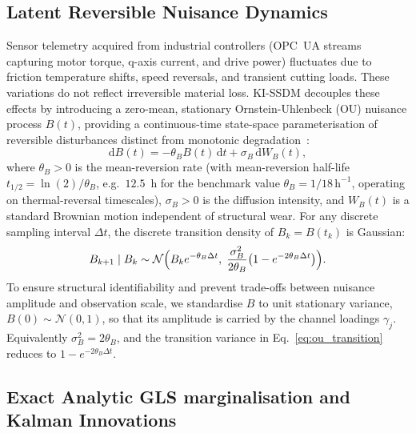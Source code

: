 \documentclass[a4paper,fleqn]{cas-dc}
\begin{document}
\subsection{Latent Reversible Nuisance Dynamics}
\label{subsec:nuisance_b}

Sensor telemetry acquired from industrial controllers (OPC~UA streams capturing motor torque, q-axis current, and drive power) fluctuates due to friction temperature shifts, speed reversals, and transient cutting loads. These variations do not reflect irreversible material loss. KI-SSDM decouples these effects by introducing a zero-mean, stationary Ornstein-Uhlenbeck (OU) nuisance process $B(t)$, providing a continuous-time state-space parameterisation of reversible disturbances distinct from monotonic degradation~\cite{Zhang_2023_RESS}:
\begin{equation}
    \mathrm{d}B(t) = -\theta_B B(t)\,\mathrm{d}t + \sigma_B\,\mathrm{d}W_B(t),
    \label{eq:ou_process}
\end{equation}
where $\theta_B > 0$ is the mean-reversion rate (with mean-reversion half-life $t_{1/2} = \ln(2) / \theta_B$, e.g.\ $12.5$~h for the benchmark value $\theta_B = 1/18\,\mathrm{h}^{-1}$, operating on thermal-reversal timescales), $\sigma_B > 0$ is the diffusion intensity, and $W_B(t)$ is a standard Brownian motion independent of structural wear. For any discrete sampling interval $\Delta t$, the discrete transition density of $B_k = B(t_k)$ is Gaussian:
\begin{equation}
    B_{k+1} \mid B_k \sim \mathcal{N}\Bigl(B_k e^{-\theta_B \Delta t}, \; \frac{\sigma_B^2}{2\theta_B}\bigl(1 - e^{-2\theta_B \Delta t}\bigr)\Bigr).
    \label{eq:ou_transition}
\end{equation}
To ensure structural identifiability and prevent trade-offs between nuisance amplitude and observation scale, we standardise $B$ to unit stationary variance, $B(0) \sim \mathcal{N}(0, 1)$, so that its amplitude is carried by the channel loadings $\gamma_j$. Equivalently $\sigma_B^2 = 2\theta_B$, and the transition variance in Eq.~\eqref{eq:ou_transition} reduces to $1 - e^{-2\theta_B \Delta t}$.

\subsection{Exact Analytic GLS marginalisation and Kalman Innovations}
\label{subsec:gls_marginalization}
\end{document}
